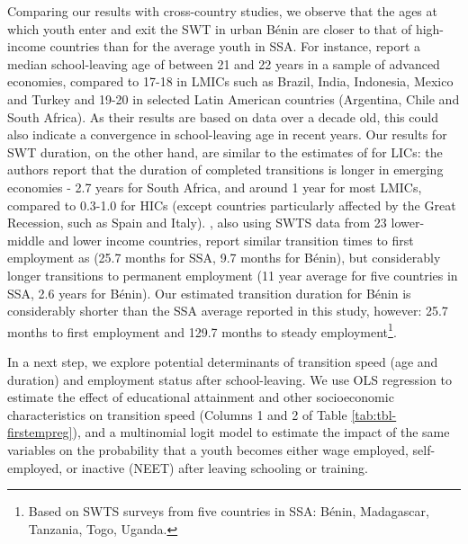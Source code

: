 \documentclass[
  a4paper, twoside, 12pt]{book}
\begin{document}
Comparing our results with cross-country studies, we observe that the ages at which youth enter and exit the SWT in urban Bénin are closer to that of high-income countries than for the average youth in SSA. For instance, \textcite{quintini2014} report a median school-leaving age of between 21 and 22 years in a sample of advanced economies, compared to 17-18 in LMICs such as Brazil, India, Indonesia, Mexico and Turkey and 19-20 in selected Latin American countries (Argentina, Chile and South Africa). As their results are based on data over a decade old, this could also indicate a convergence in school-leaving age in recent years. Our results for SWT duration, on the other hand, are similar to the estimates of \textcite{quintini2014} for LICs: the authors report that the duration of completed transitions is longer in emerging economies - 2.7 years for South Africa, and around 1 year for most LMICs, compared to 0.3-1.0 for HICs (except countries particularly affected by the Great Recession, such as Spain and Italy). \textcite{manacorda2017}, also using SWTS data from 23 lower-middle and lower income countries, report similar transition times to first employment as \textcite{quintini2014} (25.7 months for SSA, 9.7 months for Bénin), but considerably longer transitions to permanent employment (11 year average for five countries in SSA, 2.6 years for Bénin). Our estimated transition duration for Bénin is considerably shorter than the SSA average reported in this study, however: 25.7 months to first employment and 129.7 months to steady employment\footnote{Based on SWTS surveys from five countries in SSA: Bénin, Madagascar, Tanzania, Togo, Uganda.}.

\begin{singlespacing}


\end{singlespacing}

In a next step, we explore potential determinants of transition speed (age and duration) and employment status after school-leaving. We use OLS regression to estimate the effect of educational attainment and other socioeconomic characteristics on transition speed (Columns 1 and 2 of Table \ref{tab:tbl-firstempreg}), and a multinomial logit model to estimate the impact of the same variables on the probability that a youth becomes either wage employed, self-employed, or inactive (NEET) after leaving schooling or training.
\end{document}

